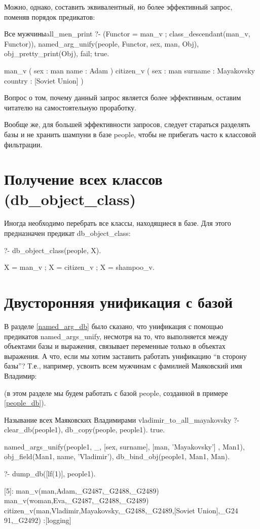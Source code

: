 \documentclass[a4paper]{book}
\def\Te{Т.\thinspace е.}
\def\na{named_args_unify}
\begin{document}
Можно, однако, составить эквивалентный, но более эффективный
запрос, поменяв порядок предикатов:

\begin{example}{Все мужчины}{all_men_print}
?- (Functor = man_v ; class_descendant(man_v, Functor)), 
   named_arg_unify(people, Functor, sex, man, Obj), 
   obj_pretty_print(Obj), fail; true.

man_v ( 
  sex : man 
  name : Adam 
) 
citizen_v ( 
  sex : man 
  surname : Mayakovsky 
  country : [Soviet Union] 
) 
\end{example}

Вопрос о том, почему данный запрос является более эффективным,
оставим читателю на самостоятельную проработку.

Вообще же, для большей эффективности запросов, следует стараться
разделять базы и не хранить шампуни в базе people, чтобы не
прибегать часто к классовой фильтрации.

\section{Получение всех классов (db_object_class)}
\label{db_object_class}

Иногда необходимо перебрать все классы, находящиеся в базе. Для
этого предназначен предикат db_object_class:

\begin{example}{}{}
?- db_object_class(people, X).

X = man_v ;
X = citizen_v ;
X = shampoo_v.
\end{example}

\section{Двусторонняя унификация с базой}
\label{db_bind_obj}

В разделе \ref{named_arg_db} было сказано, что унификация с
помощью предикатов \na{}, несмотря на то, что выполняется между
объектами базы и выражения, связывает переменные только в
объектах выражения. А что, если мы хотим заставить работать
унификацию ``в сторону базы''? \Te, например, усвоить всем
мужчинам с фамилией Маяковский имя Владимир:

(в этом разделе мы будем работать с базой people, созданной в
примере \ref{people_db}).

\begin{example}{Называние всех Маяковских Владимирами}%
               {vladimir_to_all_mayakovsky}
?- clear_db(people1), db_copy(people, people1).
true.

named_args_unify(people1, _, 
      [sex, surname], [man, 'Mayakovsky'] , Man1), 
   obj_field(Man1, name, 'Vladimir'), 
   db_bind_obj(people1, Man1, Man).

?- dump_db([lf(1)], people1).

[5]: man_v(man,Adam,_G2487,_G2488,_G2489) 
man_v(woman,Eva,_G2487,_G2488,_G2489) 
citizen_v(man,Vladimir,Mayakovsky,_G2488,_G2489,[Soviet Union],_G24
91,_G2492)                                                        
 :[logging]
\end{example}
\end{document}
